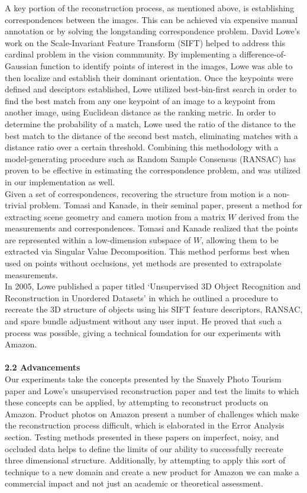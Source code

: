 \documentclass[12pt]{article}
\begin{document}
\begin{multicols}{2}
\indent A key portion of the reconstruction process, as mentioned above, is establishing correspondences between the images. This can be achieved via expensive manual annotation or by solving the longstanding correspondence problem. David Lowe's work on the Scale-Invariant Feature Transform (SIFT) helped to address this cardinal problem in the vision commmunity. By implementing a difference-of-Gaussian function to identify points of interest in the images, Lowe was able to then localize and establish their dominant orientation. Once the keypoints were defined and desciptors established, Lowe utilized best-bin-first search in order to find the best match from any one keypoint of an image to a keypoint from another image, using Euclidean distance as the ranking metric. In order to determine the probability of a match, Lowe used the ratio of the distance to the best match to the distance of the second best match, eliminating matches with a distance ratio over a certain threshold. Combining this methodology with a model-generating procedure such as Random Sample Consensus (RANSAC) has proven to be effective in estimating the correspondence problem, and was utilized in our implementation as well. \\
\indent Given a set of correspondences, recovering the structure from motion is a non-trivial problem. Tomasi and Kanade, in their seminal paper, present a method for extracting scene geometry and camera motion from a matrix $W$ derived from the measurements and correspondences. Tomasi and Kanade realized that the points are represented within a low-dimension subspace of $W$, allowing them to be extracted via Singular Value Decomposition. This method performs best when used on points without occlusions, yet methods are presented to extrapolate measurements. \\
\indent In 2005, Lowe published a paper titled `Unsupervised 3D Object Recognition and Reconstruction in Unordered Datasets' in which he outlined a procedure to recreate the 3D structure of objects using his SIFT feature descriptors, RANSAC, and spare bundle adjustment without any user input. He proved that such a process was possible, giving a technical foundation for our experiments with Amazon.\\\\
{\large \textbf{2.2 Advancements}}\\
Our experiments take the concepts presented by the Snavely Photo Tourism paper and Lowe's unsupervised reconstruction paper and test the limits to which these concepts can be applied, by attempting to reconstruct products on Amazon. Product photos on Amazon present a number of challenges which make the reconstruction process difficult, which is elaborated in the Error Analysis section. Testing methods presented in these papers on imperfect, noisy, and occluded data helps to define the limits of our ability to successfully recreate three dimensional structure. Additionally, by attempting to apply this sort of technique to a new domain and create a new product for Amazon we can make a commercial impact and not just an academic or theoretical assessment. \\\\

\end{multicols}
\end{document}
